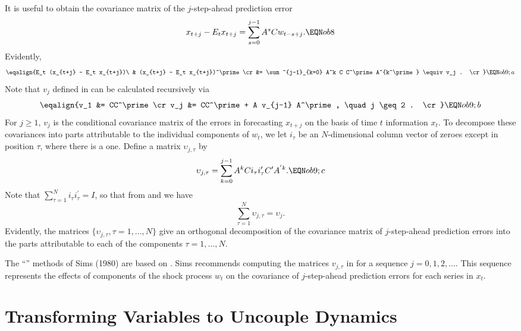 It is useful to obtain the covariance matrix of the $j$-step-ahead prediction
error
$$x_{t+j} - E_t x_{t+j} = \sum^{j-1}_{s=0} A^s C w_{t-s+j}. \EQN ob8 $$
Evidently,
$$\eqalign{E_t (x_{t+j} - E_t x_{t+j})\ & (x_{t+j} - E_t x_{t+j})^\prime\cr
&= \sum^{j-1}_{k=0} A^k C C^\prime A^{k^\prime} \equiv v_j . \cr } \EQN
ob9;a $$
Note that $v_j$ defined in  can be calculated recursively via
$$\eqalign{v_1 &= CC^\prime \cr
v_j &= CC^\prime + A v_{j-1} A^\prime, \quad j \geq 2 . \cr}\EQN ob9;b $$
For $j \geq 1$,  $v_j$ is the conditional covariance matrix of the errors in forecasting
$x_{t+j}$ on the basis of time $t$ information $x_t$.  To decompose these
covariances into parts attributable to the individual components of $w_t$, we
let $i_\tau$ be an $N$-dimensional column vector of zeroes except in position
$\tau$, where there is a one.  Define a matrix $\upsilon_{j,\tau}$ by
$$ \upsilon_{j,\tau} = \sum_{k=0}^{j-1} A^k C i_\tau i_\tau^\prime C^\prime
A^{^\prime k} . \EQN ob9;c $$
Note that $\sum_{\tau=1}^N i_\tau i_\tau^\prime = I$, so that from
 and  we have
$$\sum_{\tau=1}^N \upsilon_{j, \tau} = \upsilon_j . $$
Evidently, the matrices $\{ \upsilon_{j, \tau} , \tau = 1, \ldots, N \}$ give
an orthogonal decomposition of the covariance matrix of $j$-step-ahead
prediction errors into the parts attributable to each of the components $\tau =
1, \ldots, N$.

The ``'' methods of Sims (1980) are based on .
Sims recommends computing the matrices $v_{j,\tau}$ in  for a
sequence $j= 0,1,2, \ldots$. This sequence represents
the effects of components of the shock process $w_t$ on the
covariance of $j$-step-ahead prediction errors for each series in
$x_t$.

\section
{Transforming Variables to Uncouple Dynamics}

